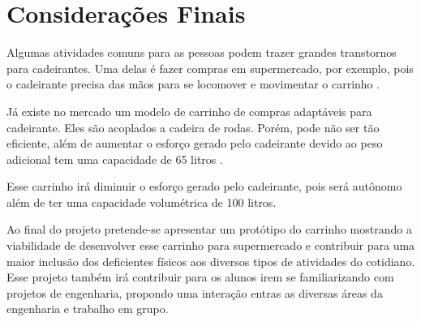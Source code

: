 \chapter[Considerações Finais]{Considerações Finais}
Algumas atividades comuns para as pessoas podem trazer grandes transtornos para cadeirantes. Uma delas é fazer compras em supermercado, por exemplo, pois o cadeirante precisa das mãos para se locomover e movimentar o carrinho \cite{blog_cadeir}. 

\par Já existe no mercado um modelo de carrinho de compras adaptáveis para cadeirante. Eles são acoplados a cadeira de rodas. Porém, pode não ser tão eficiente, além de aumentar o esforço gerado pelo cadeirante devido ao peso adicional tem uma capacidade de 65 litros \cite{blog_defic}. 

\par Esse carrinho irá diminuir o esforço gerado pelo cadeirante, pois será autônomo além de ter uma capacidade volumétrica de 100 litros.

\par Ao final do projeto pretende-se apresentar um protótipo do carrinho mostrando a viabilidade de desenvolver esse carrinho para supermercado e contribuir para uma maior inclusão dos deficientes físicos aos diversos tipos de atividades do cotidiano. Esse projeto também irá contribuir para os alunos irem se familiarizando com projetos de engenharia, propondo uma interação entras as diversas áreas da engenharia e trabalho em grupo. 

 

